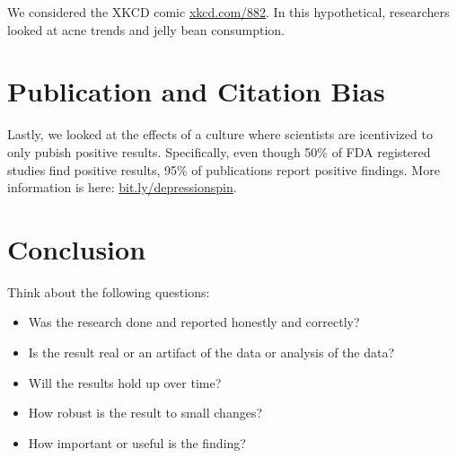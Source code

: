 We considered the XKCD comic \url{xkcd.com/882}. In this hypothetical, researchers looked at acne trends and jelly bean consumption. 

\section{Publication and Citation Bias}

Lastly, we looked at the effects of a culture where scientists are icentivized to only pubish positive results. Specifically, even though 50\% of FDA registered studies find positive results, 95\% of publications report positive findings. More information is here: \url{bit.ly/depressionspin}.

\section{Conclusion}

Think about the following questions:

\begin{itemize}
    \item Was the research done and reported honestly and correctly?
    \item Is the result real or an artifact of the data or analysis of the data?
    \item Will the results hold up over time?
    \item How robust is the result to small changes?
    \item How important or useful is the finding? 
\end{itemize}
